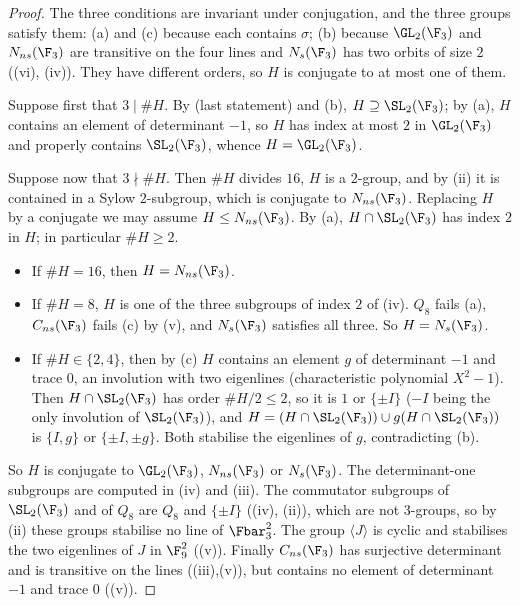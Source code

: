 \begin{proof}
The three conditions are invariant under conjugation, and the three groups satisfy them: (a) and (c) because each contains $\sigma$; (b) because $\GL_2(\F_3)$ and
$N_{ns}(\F_3)$ are transitive on the four lines and $N_s(\F_3)$ has two orbits of size $2$ ((vi), (iv)). They have different
orders, so $H$ is conjugate to at most one of them.

Suppose first that $3\mid\#H$. By  (last statement) and (b), $H\supseteq\SL_2(\F_3)$; by (a), $H$ contains an element of determinant $-1$, so
$H$ has index at most $2$ in $\GL_2(\F_3)$ and properly contains $\SL_2(\F_3)$, whence $H=\GL_2(\F_3)$.

Suppose now that $3\nmid\#H$. Then $\#H$ divides $16$, $H$ is a $2$-group, and by (ii) it is contained in a Sylow $2$-subgroup, which is conjugate to
$N_{ns}(\F_3)$. Replacing $H$ by a conjugate we may assume $H\le N_{ns}(\F_3)$. By (a), $H\cap\SL_2(\F_3)$ has index $2$ in $H$; in particular $\#H\ge2$.
\begin{itemize}
\item If $\#H=16$, then $H=N_{ns}(\F_3)$.
\item If $\#H=8$, $H$ is one of the three subgroups of index $2$ of (iv). $Q_8$ fails (a), $C_{ns}(\F_3)$ fails (c) by
(v), and $N_s(\F_3)$ satisfies all three. So $H=N_s(\F_3)$.
\item If $\#H\in\{2,4\}$, then by (c) $H$ contains an element $g$ of determinant $-1$ and trace $0$, an involution with two eigenlines (characteristic polynomial
$X^2-1$). Then $H\cap\SL_2(\F_3)$ has order $\#H/2\le2$, so it is $1$ or $\{\pm I\}$ ($-I$ being the only involution of $\SL_2(\F_3)$), and $H=(H\cap\SL_2(\F_3))\cup g(H\cap\SL_2(\F_3))$
is $\{I,g\}$ or $\{\pm I,\pm g\}$. Both stabilise the eigenlines of $g$, contradicting (b).
\end{itemize}
So $H$ is conjugate to $\GL_2(\F_3)$, $N_{ns}(\F_3)$ or $N_s(\F_3)$. The determinant-one subgroups are computed in (iv) and (iii).
The commutator subgroups of $\SL_2(\F_3)$ and of $Q_8$ are $Q_8$ and $\{\pm I\}$ ((iv), (ii)), which are not $3$-groups, so by
(ii) these groups stabilise no line of $\Fbar_3^2$. The group $\langle J\rangle$ is cyclic and stabilises the two eigenlines of $J$ in $\F_9^2$
((v)). Finally $C_{ns}(\F_3)$ has surjective determinant and is transitive on the lines ((iii),(v)), but contains no
element of determinant $-1$ and trace $0$ ((v)).
\end{proof}

